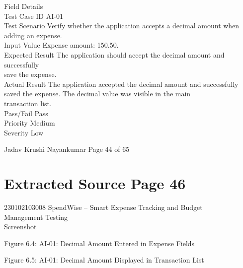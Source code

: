 \documentclass[12pt,a4paper]{report}
\begin{document}
\smallskip
Field                   Details\\ 
Test Case ID            AI-01\\ 
Test Scenario           Verify whether the application accepts a decimal amount when\\ 
adding an expense.\\ 
Input Value             Expense amount: 150.50.\\ 
Expected Result         The application should accept the decimal amount and successfully\\ 
save the expense.\\ 
Actual Result           The application accepted the decimal amount and successfully\\ 
saved the expense. The decimal value was visible in the main\\ 
transaction list.\\ 
Pass/Fail               Pass\\ 
Priority                Medium\\ 
Severity                Low\\ 

\smallskip

\smallskip

\smallskip

\smallskip
Jadav Krushi Nayankumar                                                       Page 44 of 65\\ 

\clearpage
\section*{Extracted Source Page 46}
230102103008                       SpendWise – Smart Expense Tracking and Budget\\ 
Management Testing\\ 

\smallskip
Screenshot\\ 

\smallskip

\smallskip

\smallskip

\smallskip
Figure 6.4: AI-01: Decimal Amount Entered in Expense Fields\\ 

\smallskip

\smallskip

\smallskip

\smallskip
Figure 6.5: AI-01: Decimal Amount Displayed in Transaction List\\ 
\end{document}
